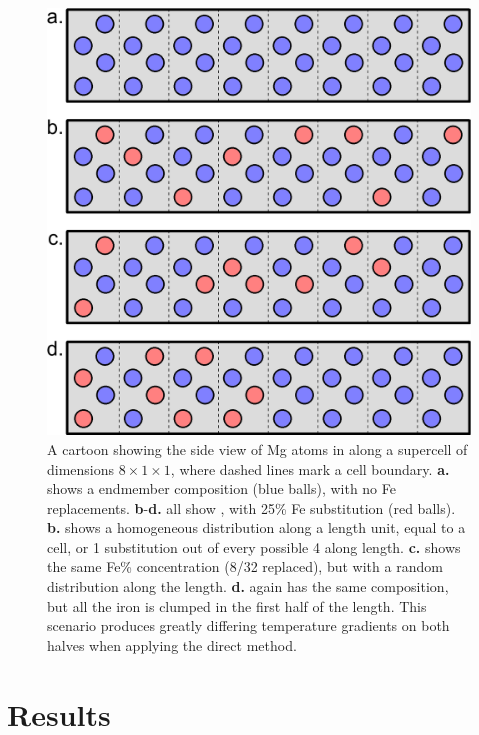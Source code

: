 \begin{figure}[h!]
  \includegraphics[width=\linewidth]{Figures/substitution_05-collated.png}
  \caption[]{A cartoon showing the side view of Mg atoms in \mgsios along a supercell of dimensions $8\times1\times1$, where dashed lines mark a cell boundary. \textbf{a.} shows a \mgsios endmember composition (blue balls), with no Fe replacements. \textbf{b}-\textbf{d.} all show \mgfesio, with 25\% Fe substitution (red balls). \textbf{b.} shows a homogeneous distribution along a length unit, equal to a cell, or 1 substitution out of every possible 4 along length. \textbf{c.} shows the same Fe\% concentration (8/32 replaced), but with a random distribution along the length. \textbf{d.} again has the same composition, but all the iron is clumped in the first half of the length. This scenario produces greatly differing temperature gradients on both halves when applying the direct method.}
  \label{fig:substitutions}
\end{figure}



\section{Results}

